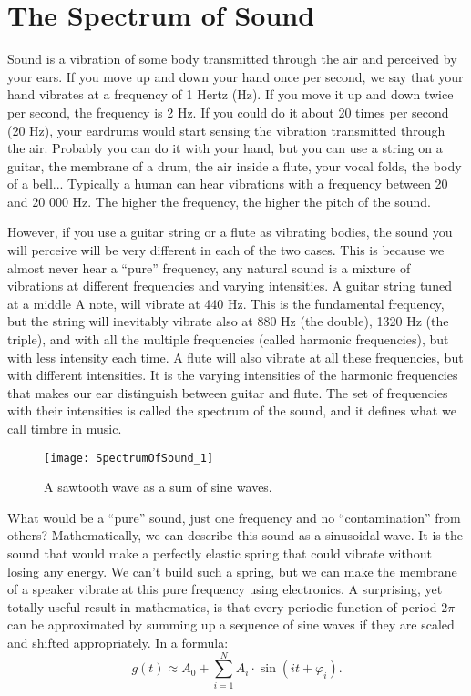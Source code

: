 \section{The Spectrum of Sound}

Sound is a vibration of some body transmitted through the air and perceived by your ears. If you move up and down your hand once per second, we say that your hand vibrates at a frequency of 1 Hertz (Hz). If you move it up and down twice per second, the frequency is 2 Hz. If you could do it about 20 times per second (20 Hz), your eardrums would start sensing the vibration transmitted through the air. Probably you can do it with your hand, but you can use a string on a guitar, the membrane of a drum, the air inside a flute, your vocal folds, the body of a bell... Typically a human can hear vibrations with a frequency between 20 and 20 000 Hz. The higher the frequency, the higher the pitch of the sound.

However, if you use a guitar string or a flute as vibrating bodies, the sound you will perceive will be very different in each of the two cases. This is because we almost never hear a ``pure'' frequency, any natural sound is a mixture of vibrations at different frequencies and varying intensities. A guitar string tuned at a middle A note, will vibrate at 440 Hz. This is the fundamental frequency, but the string will inevitably vibrate also at 880 Hz (the double), 1320 Hz (the triple), and with all the multiple frequencies (called harmonic frequencies), but with less intensity each time. A flute will also vibrate at all these frequencies, but with different intensities. It is the varying intensities of the harmonic frequencies that makes our ear distinguish between guitar and flute. The set of frequencies with their intensities is called the spectrum of the sound, and it defines what we call timbre in music.

\begin{wrapfigure}[15]{l}{0.35\textwidth}
\centering
\texttt{[image: SpectrumOfSound\_1]}
\caption*{A sawtooth wave as a sum of sine waves.}
\end{wrapfigure}

What would be a ``pure'' sound, just one frequency and no ``contamination'' from others? Mathematically, we can describe this sound as a sinusoidal wave. It is the sound that would make a perfectly elastic spring that could vibrate without losing any energy. We can't build such a spring, but we can make the membrane of a speaker vibrate at this pure frequency using electronics. A surprising, yet totally useful result in mathematics, is that every periodic function of period $2\pi$ can be approximated by summing up a sequence of sine waves if they are scaled and shifted appropriately. In a formula:
$$g(t) \approx A_0 + \sum_{i=1}^N A_i \cdot \sin(i t + \varphi_i).$$


